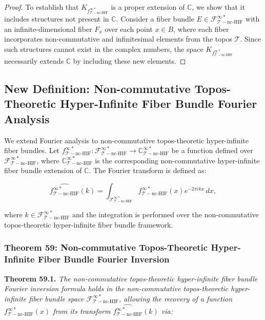 \documentclass{article}
\begin{document}
\begin{proof}
To establish that \(K_{f_{\mathcal{T}-\text{nc-HIF}}^{\infty *}}\) is a proper extension of \(\mathbb{C}\), we show that it includes structures not present in \(\mathbb{C}\). Consider a fiber bundle \(E \in \mathcal{F}_{\mathcal{T}-\text{nc-HIF}}^{\infty *}\) with an infinite-dimensional fiber \(F_x\) over each point \(x \in B\), where each fiber incorporates non-commutative and infinitesimal elements from the topos \(\mathcal{T}\). Since such structures cannot exist in the complex numbers, the space \(K_{f_{\mathcal{T}-\text{nc-HIF}}^{\infty *}}\) necessarily extends \(\mathbb{C}\) by including these new elements.
\end{proof}

\subsection{New Definition: Non-commutative Topos-Theoretic Hyper-Infinite Fiber Bundle Fourier Analysis}
We extend Fourier analysis to non-commutative topos-theoretic hyper-infinite fiber bundles. Let \(f_{\mathcal{T}-\text{nc-HIF}}^{\infty *}: \mathcal{F}_{\mathcal{T}-\text{nc-HIF}}^{\infty *} \to \mathbb{C}_{\mathcal{T}-\text{nc-HIF}}^{\infty *}\) be a function defined over \(\mathcal{F}_{\mathcal{T}-\text{nc-HIF}}^{\infty *}\), where \(\mathbb{C}_{\mathcal{T}-\text{nc-HIF}}^{\infty *}\) is the corresponding non-commutative hyper-infinite fiber bundle extension of \(\mathbb{C}\). The Fourier transform is defined as:

\[
\widehat{f_{\mathcal{T}-\text{nc-HIF}}^{\infty *}}(k) = \int_{\mathcal{F}_{\mathcal{T}-\text{nc-HIF}}^{\infty *}} f_{\mathcal{T}-\text{nc-HIF}}^{\infty *}(x) e^{-2\pi i k x} \, dx,
\]

where \(k \in \mathcal{F}_{\mathcal{T}-\text{nc-HIF}}^{\infty *}\) and the integration is performed over the non-commutative topos-theoretic hyper-infinite fiber bundle framework.

\subsubsection{Theorem 59: Non-commutative Topos-Theoretic Hyper-Infinite Fiber Bundle Fourier Inversion}
\textbf{Theorem 59.1.} \textit{The non-commutative topos-theoretic hyper-infinite fiber bundle Fourier inversion formula holds in the non-commutative topos-theoretic hyper-infinite fiber bundle space \(\mathcal{F}_{\mathcal{T}-\text{nc-HIF}}^{\infty *}\), allowing the recovery of a function \(f_{\mathcal{T}-\text{nc-HIF}}^{\infty *}(x)\) from its transform \(\widehat{f_{\mathcal{T}-\text{nc-HIF}}^{\infty *}}(k)\) via:}
\end{document}
